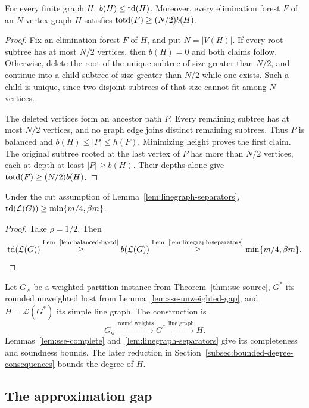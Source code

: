 \begin{lemma}\label{lem:balanced-by-td}
For every finite graph $H$, $b(H)\leq\operatorname{td}(H)$.
Moreover, every elimination forest $F$ of an $N$-vertex graph $H$
satisfies $\operatorname{totd}(F)\geq(N/2)b(H)$.
\end{lemma}

\begin{proof}
Fix an elimination forest $F$ of $H$, and put $N=|V(H)|$.
If every root subtree has
at most $N/2$ vertices, then $b(H)=0$ and both claims follow.
Otherwise, delete the root of the unique subtree of size greater
than $N/2$, and continue into a child subtree of size greater than
$N/2$ while one exists. Such a child is unique, since two disjoint
subtrees of that size cannot fit among $N$ vertices.

The deleted vertices form an ancestor path $P$. Every remaining
subtree has at most $N/2$ vertices, and no graph edge joins distinct
remaining subtrees. Thus $P$ is balanced and
$b(H)\leq|P|\leq h(F)$. Minimizing height proves the first claim.
The original subtree rooted at the last vertex of $P$ has more than
$N/2$ vertices, each at depth at least $|P|\geq b(H)$. Their depths
alone give $\operatorname{totd}(F)\geq(N/2)b(H)$.
\end{proof}

\begin{corollary}\label{lem:sse-sound}
Under the cut assumption of Lemma~\ref{lem:linegraph-separators},
$\operatorname{td}(\mathcal L(G))\geq\min\{m/4,\beta m\}$.
\end{corollary}

\begin{proof}
Take $\rho=1/2$. Then
\[
 \operatorname{td}(\mathcal L(G))
 \overset{\text{Lem.~\ref{lem:balanced-by-td}}}{\geq}
 b(\mathcal L(G))
 \overset{\text{Lem.~\ref{lem:linegraph-separators}}}{\geq}
 \min\{m/4,\beta m\}.
\]
\end{proof}

Let $G_{\mathrm w}$ be a weighted partition instance from
Theorem~\ref{thm:sse-source},
$G^*$ its rounded unweighted host from
Lemma~\ref{lem:sse-unweighted-gap}, and $H=\mathcal L(G^*)$ its
simple line graph. The construction is
\[
 G_{\mathrm w}\xrightarrow{\text{round weights}}G^*
 \xrightarrow{\text{line graph}}H.
\]
Lemmas~\ref{lem:sse-complete} and~\ref{lem:linegraph-separators}
give its completeness and soundness bounds. The later reduction
in Section~\ref{subsec:bounded-degree-consequences} bounds the degree
of $H$.

\subsection{The approximation gap}
\label{subsec:sse-dense-gap}

